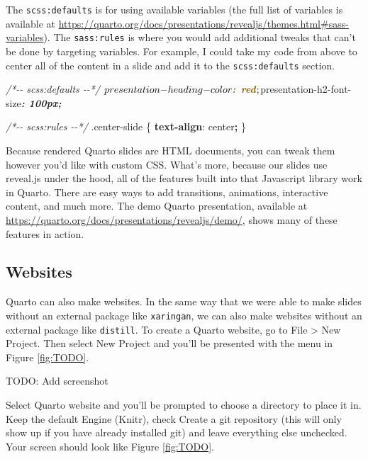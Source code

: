 \documentclass[
]{book}
\newenvironment{Shaded}{\begin{snugshade}}{\end{snugshade}}
\newcommand{\CommentTok}[1]{\textcolor[rgb]{0.56,0.35,0.01}{\textit{#1}}}
\newcommand{\DecValTok}[1]{\textcolor[rgb]{0.00,0.00,0.81}{#1}}
\newcommand{\FunctionTok}[1]{\textcolor[rgb]{0.00,0.00,0.00}{#1}}
\newcommand{\InformationTok}[1]{\textcolor[rgb]{0.56,0.35,0.01}{\textbf{\textit{#1}}}}
\newcommand{\KeywordTok}[1]{\textcolor[rgb]{0.13,0.29,0.53}{\textbf{#1}}}
\newcommand{\NormalTok}[1]{#1}
\newcommand{\OperatorTok}[1]{\textcolor[rgb]{0.81,0.36,0.00}{\textbf{#1}}}
\begin{document}
The \texttt{scss:defaults} is for using available variables (the full list of variables is available at \url{https://quarto.org/docs/presentations/revealjs/themes.html\#sass-variables}). The \texttt{sass:rules} is where you would add additional tweaks that can't be done by targeting variables. For example, I could take my code from above to center all of the content in a slide and add it to the \texttt{scss:defaults} section.

\begin{Shaded}
\begin{Highlighting}[]
\CommentTok{/*{-}{-} scss:defaults {-}{-}*/}
\NormalTok{$presentation{-}heading{-}color}\InformationTok{: red}\NormalTok{;}
\NormalTok{$presentation{-}h2{-}font{-}size}\InformationTok{: 100px;}

\CommentTok{/*{-}{-} scss:rules {-}{-}*/}
\FunctionTok{.center{-}slide}\NormalTok{ \{}
  \KeywordTok{text{-}align}\NormalTok{: }\DecValTok{center}\OperatorTok{;}
\NormalTok{\}}
\end{Highlighting}
\end{Shaded}

Because rendered Quarto slides are HTML documents, you can tweak them however you'd like with custom CSS. What's more, because our slides use reveal.js under the hood, all of the features built into that Javascript library work in Quarto. There are easy ways to add transitions, animations, interactive content, and much more. The demo Quarto presentation, available at \url{https://quarto.org/docs/presentations/revealjs/demo/}, shows many of these features in action.

\hypertarget{websites}{%
\subsection*{Websites}\label{websites}}

Quarto can also make websites. In the same way that we were able to make slides without an external package like \texttt{xaringan}, we can also make websites without an external package like \texttt{distill}. To create a Quarto website, go to File \textgreater{} New Project. Then select New Project and you'll be presented with the menu in Figure \ref{fig:TODO}.

TODO: Add screenshot

Select Quarto website and you'll be prompted to choose a directory to place it in. Keep the default Engine (Knitr), check Create a git repository (this will only show up if you have already installed git) and leave everything else unchecked. Your screen should look like Figure \ref{fig:TODO}.
\end{document}
